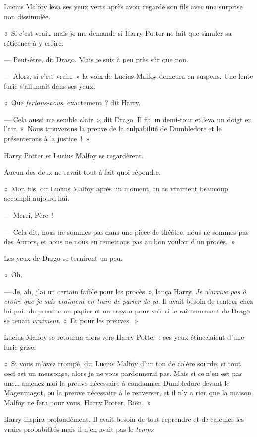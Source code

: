 Lucius Malfoy leva ses yeux verts après avoir regardé son fils avec une surprise non dissimulée.

«~Si c'est vrai… mais je me demande si Harry Potter ne fait que simuler sa réticence à y croire.

--- Peut-être, dit Drago. Mais je suis à peu près sûr que non.

--- Alors, si c'est vrai…~» la voix de Lucius Malfoy demeura en suspens. Une lente furie s'allumait dans ses yeux.

«~Que \emph{ferions-nous}, exactement~? dit Harry.

--- Cela aussi me semble clair~», dit Drago. Il fit un demi-tour et leva un doigt en l'air. «~Nous trouverons la preuve de la culpabilité de Dumbledore et le présenterons à la justice~!~»

Harry Potter et Lucius Malfoy se regardèrent.

Aucun des deux ne savait tout à fait quoi répondre.

«~Mon fils, dit Lucius Malfoy après un moment, tu as vraiment beaucoup accompli aujourd'hui.

--- Merci, Père~!

--- Cela dit, nous ne sommes pas dans une pièce de théâtre, nous ne sommes pas des Aurors, et nous ne nous en remettons pas au bon vouloir d'un procès.~»

Les yeux de Drago se ternirent un peu.

«~Oh.

--- Je, ah, j'ai un certain faible pour les procès~», lança Harry. \emph{Je n'arrive pas à croire que je suis vraiment en train de parler de ça}. Il avait besoin de rentrer chez lui puis de prendre un papier et un crayon pour voir si le raisonnement de Drago se tenait \emph{vraiment}. «~Et pour les preuves.~»

Lucius Malfoy se retourna alors vers Harry Potter~; ses yeux étincelaient d'une furie grise.

«~Si vous m'avez trompé, dit Lucius Malfoy d'un ton de colère sourde, si tout ceci est un mensonge, alors je ne vous pardonnerai pas. Mais si ce n'en est pas une… amenez-moi la preuve nécessaire à condamner Dumbledore devant le Magenmagot, ou la preuve nécessaire à le renverser, et il n'y a rien que la maison Malfoy ne fera pour vous, Harry Potter. Rien.~»

Harry inspira profondément. Il avait besoin de tout reprendre et de calculer les vraies probabilités mais il n'en avait pas le \emph{temps}.

